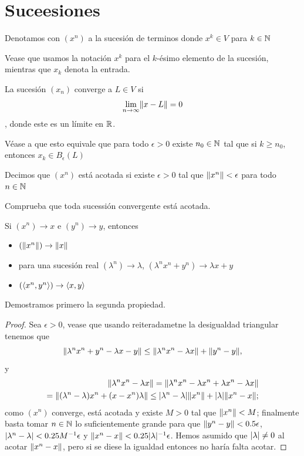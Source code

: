 \section{Suceesiones}
\begin{definition}
  Denotamos con $(x^n)$ a la sucesión de terminos donde $x^k\in V$ para $k\in \mathbb{N}$ 
\end{definition}
Vease que usamos la notación $x^k$ para el $k$-ésimo elemento de la sucesión, mientras que $x_k$ denota la entrada.
\begin{definition}[Convergencia]
  La sucesión $(x_n)$ converge a $L\in V$ si \[
    \lim_{n\to\infty}\lVert x-L\rVert=0
  \], donde este es un límite en $\mathbb{R}$.
\end{definition}
Véase a que esto equivale que para todo $\epsilon>0$ existe $n_0\in \mathbb{N}$ tal que si $k\geq n_0$, entonces $x_k\in B_\epsilon (L)$
\begin{definition}
  Decimos que $(x^n)$ está acotada si existe $\epsilon >0$ tal que $\lVert x^n\rVert<\epsilon$ para todo $n \in \mathbb{N}$ 
\end{definition}
Comprueba que toda sucessión convergente está acotada.
\begin{lemma}
Si $(x^n)\to x$ e $(y^n)\to y$, entonces 
\begin{itemize}
  \item $(\lVert x^n\rVert)\to \lVert x\rVert$ 
  \item para una sucesión real $(\lambda^n)\to \lambda$, $(\lambda^n x^n+y^n)\to \lambda x+y$
  \item $(\langle x^n, y^n\rangle)\to \langle x,y\rangle$ 
\end{itemize}
\end{lemma}
Demostramos primero la segunda propiedad.
\begin{proof}
    Sea $\epsilon >0$, vease que usando reiteradametne la desigualdad triangular tenemos que \[
      \lVert\lambda^n x^n+y^n-\lambda x-y\rVert\leq \lVert\lambda^n x^n -\lambda x\rVert+\lVert y^n-y\rVert,
    \] 
    y 
    \begin{align*}
    \lVert\lambda^n x^n -\lambda x\rVert
    =\lVert\lambda^n x^n -\lambda x^n+\lambda x^n-\lambda x\rVert\\
    = \lVert(\lambda^n -\lambda)x^n+(x-x^n)\lambda\rVert\leq \lvert\lambda^n -\lambda\rvert\lVert x^n\rVert+\lvert\lambda\rvert \lVert x^n-x\rVert;
    \end{align*}
    como $(x^n)$ converge, está acotada y existe $M>0$ tal que $\lVert x^n\rVert<M$; finalmente basta tomar $n \in \mathbb{N}$ lo suficientemente grande para que $\lVert y^n-y\rVert<0.5\epsilon$, $\lvert\lambda^n-\lambda\rvert<0.25 M^{-1}\epsilon$ y $\lVert x^n-x\rVert<0.25 \lvert\lambda\rvert^{-1} \epsilon $. Hemos asumido que $\lvert\lambda\rvert \neq 0$ al acotar $\lVert x^n-x\rVert$, pero si se diese la igualdad entonces no haría falta acotar.
\end{proof}
